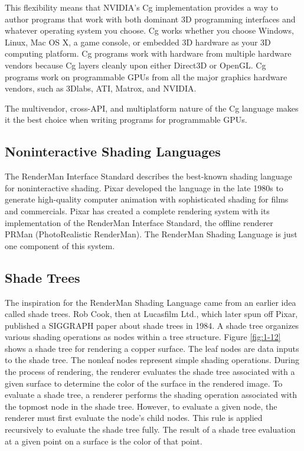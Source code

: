 \documentclass[../main.tex]{subfiles}
\begin{document}
This flexibility means that NVIDIA's Cg implementation provides a way to author programs that work with both dominant 3D programming interfaces and whatever operating system you choose. Cg works whether you choose Windows, Linux, Mac OS X, a game console, or embedded 3D hardware as your 3D computing platform. Cg programs work with hardware from multiple hardware vendors because Cg layers cleanly upon either Direct3D or OpenGL. Cg programs work on programmable GPUs from all the major graphics hardware vendors, such as 3Dlabs, ATI, Matrox, and NVIDIA.

The multivendor, cross-API, and multiplatform nature of the Cg language makes it the best choice when writing programs for programmable GPUs.

\subsection{Noninteractive Shading Languages}

The RenderMan Interface Standard describes the best-known shading language for noninteractive shading. Pixar developed the language in the late 1980s to generate high-quality computer animation with sophisticated shading for films and commercials. Pixar has created a complete rendering system with its implementation of the RenderMan Interface Standard, the offline renderer PRMan (PhotoRealistic RenderMan). The RenderMan Shading Language is just one component of this system.

\subsection*{Shade Trees}

The inspiration for the RenderMan Shading Language came from an earlier idea called shade trees. Rob Cook, then at Lucasfilm Ltd., which later spun off Pixar, published a SIGGRAPH paper about shade trees in 1984. A shade tree organizes various shading operations as nodes within a tree structure. Figure \ref{fig:1-12} shows a shade tree for rendering a copper surface. The leaf nodes are data inputs to the shade tree. The nonleaf nodes represent simple shading operations. During the process of rendering, the renderer evaluates the shade tree associated with a given surface to determine the color of the surface in the rendered image. To evaluate a shade tree, a renderer performs the shading operation associated with the topmost node in the shade tree. However, to evaluate a given node, the renderer must first evaluate the node's child nodes. This rule is applied recursively to evaluate the shade tree fully. The result of a shade tree evaluation at a given point on a surface is the color of that point.
\end{document}
